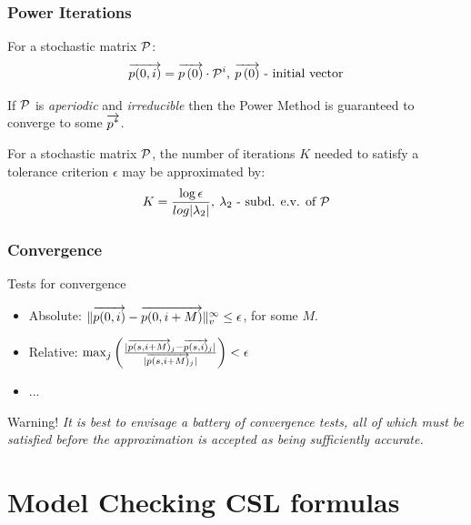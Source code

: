 \documentclass{beamer}
\begin{document}
\frame
{
	\frametitle{Power Iterations  \cite{Stewart_94}}
	{\small
	\begin{definition}
		For a stochastic matrix $\mathcal{P}$:
		\begin{equation}
			\overrightarrow{p(0,i)}  = \overrightarrow{p \left( 0 \right)} \cdot \mathcal{P}^i, \: \overrightarrow{p \left( 0 \right)} \textrm{ - initial vector} \nonumber
		\end{equation}
	\end{definition}
	\begin{theorem}
		 If $\mathcal{P}$ is \emph{aperiodic} and \emph{irreducible} then the Power Method is guaranteed to converge to some $\overrightarrow{p^{*}}$.
	\end{theorem}
	\begin{lemma}
		For a stochastic matrix $\mathcal{P}$, the number of iterations $K$ needed to satisfy a tolerance criterion $\epsilon$ may be approximated by:
		\begin{equation}
			K = \dfrac{\log \epsilon}{log | \lambda_{2} |}, \: \lambda_{2} \textrm{ - subd. e.v. of }\mathcal{P} \nonumber
		\end{equation}
	\end{lemma}
	}
}
	
\frame
{
	\frametitle{Convergence \cite{Stewart_94}}
	
	\begin{alertblock}{Tests for convergence}
		\begin{itemize}
			\item Absolute: $\lVert  \overrightarrow{p(0,i)} - \overrightarrow{p(0,i+M)}  \rVert_{v}^{\infty} \leq \epsilon$, for some $M$.
			\item Relative: $\max_{j} \left( \frac{ | \overrightarrow{p(s,i{+}M)}_{j} - \overrightarrow{p(s,i)}_{j} |}{ | \overrightarrow{p(s,i{+}M)}_{j}  |} \right) < \epsilon$
			\item ...
		\end{itemize}
	\end{alertblock}
		
	\begin{block}{\alert{Warning!}}
		\emph{It is best to envisage a battery of convergence tests, all of which must be satisfied before the approximation is accepted as being sufficiently accurate.}
	\end{block}
}
	
\section{Model Checking CSL formulas}

\end{document}
